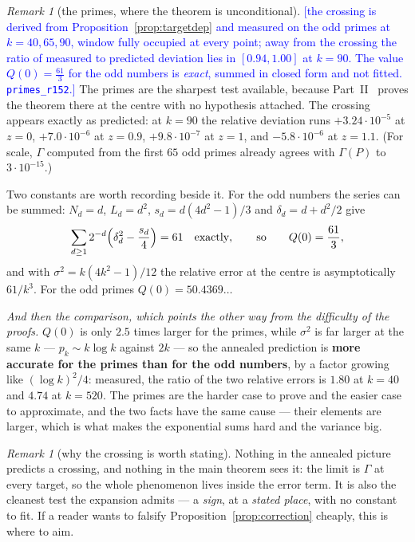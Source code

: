 \documentclass[11pt,a4paper]{article}
\theoremstyle{plain}
\theoremstyle{definition}
\theoremstyle{remark}
\newtheorem{remark}[theorem]{Remark}
\newcommand{\STATUS}[1]{\textcolor{blue}{\textsf{[#1]}}}
\begin{document}
\begin{remark}[the primes, where the theorem is unconditional]\label{rem:primescrossing}
\STATUS{the crossing is derived from Proposition~\ref{prop:targetdep} and measured on the odd
primes at $k=40,65,90$, window fully occupied at every point; away from the crossing the ratio of
measured to predicted deviation lies in $[0.94,1.00]$ at $k=90$. The value
$Q(0)=\tfrac{61}{3}$ for the odd numbers is \emph{exact}, summed in closed form and not fitted.
\texttt{primes\_r152}.}
The primes are the sharpest test available, because Part~II~\cite{P2} proves the theorem there at
the centre with no hypothesis attached. The crossing appears exactly as predicted: at $k=90$ the
relative deviation runs $+3.24\cdot10^{-5}$ at $z=0$, $+7.0\cdot10^{-6}$ at $z=0.9$,
$+9.8\cdot10^{-7}$ at $z=1$, and $-5.8\cdot10^{-6}$ at $z=1.1$. (For scale, $\Gamma$ computed from
the first $65$ odd primes already agrees with $\Gamma(P)$ to $3\cdot10^{-15}$.)

Two constants are worth recording beside it. For the odd numbers the series can be summed:
$N_d=d$, $L_d=d^{2}$, $s_d=d(4d^{2}-1)/3$ and $\delta_d=d+d^{2}/2$ give
\[
  \sum_{d\ge1}2^{-d}\Bigl(\delta_d^{2}-\frac{s_d}{4}\Bigr)=61
  \quad\text{exactly},\qquad\text{so}\qquad Q(0)=\frac{61}{3},
\]
and with $\sigma^{2}=k(4k^{2}-1)/12$ the relative error at the centre is asymptotically $61/k^{3}$.
For the odd primes $Q(0)=50.4369\ldots$

\emph{And then the comparison, which points the other way from the difficulty of the proofs.}
$Q(0)$ is only $2.5$ times larger for the primes, while $\sigma^{2}$ is far larger at the same
$k$ --- $p_k\sim k\log k$ against $2k$ --- so the annealed prediction is \textbf{more accurate for
the primes than for the odd numbers}, by a factor growing like $(\log k)^{2}/4$: measured, the
ratio of the two relative errors is $1.80$ at $k=40$ and $4.74$ at $k=520$. The primes are the
harder case to prove and the easier case to approximate, and the two facts have the same cause ---
their elements are larger, which is what makes the exponential sums hard and the variance big.
\end{remark}

\begin{remark}[why the crossing is worth stating]\label{rem:crossing}
Nothing in the annealed picture predicts a crossing, and nothing in the main theorem sees it: the
limit is $\Gamma$ at every target, so the whole phenomenon lives inside the error term. It is
also the cleanest test the expansion admits --- a \emph{sign}, at a \emph{stated place}, with no
constant to fit. If a reader wants to falsify Proposition~\ref{prop:correction} cheaply, this is
where to aim.
\end{remark}
\end{document}
